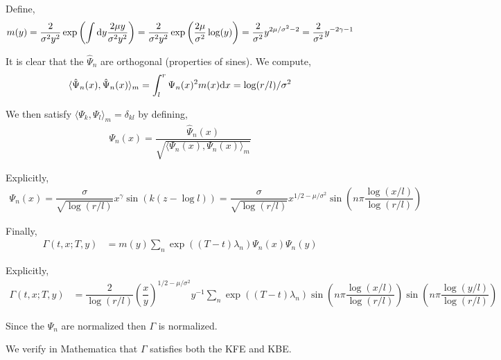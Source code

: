 \documentclass[10pt]{article}
\begin{document}
\begin{solution}[Solution]
Define,
\begin{align*}
    m(y) = \dfrac{2}{\sigma^2 y^2} \exp \left( \int\mathrm{d} y \dfrac{2 \mu y}{\sigma^2y^2}\right) 
    = \dfrac{2}{\sigma^2y^2}\exp \left( \dfrac{2\mu}{\sigma^2} \log(y) \right) 
    = \dfrac{2}{\sigma^2} y^{2\mu/\sigma^2-2}
    = \dfrac{2}{\sigma^2} y^{-2\gamma-1}
\end{align*}

It is clear that the \( \hat{\Psi}_n \) are orthogonal (properties of sines). We compute,
\begin{align*}
    \langle \hat{\Psi}_n(x), \hat{\Psi}_n(x) \rangle_m 
    = \int_{l}^{r}\Psi_n(x)^2 m(x) \mathrm{d} x 
    = \log(r/l) / \sigma^2
\end{align*}

We then satisfy \( \langle \Psi_k ,\Psi_l \rangle_m = \delta_{kl} \) by defining,
\begin{align*}
    \Psi_n(x) = \dfrac{ \hat{\Psi}_n(x) }{\sqrt{\langle \Psi_n(x), \Psi_n(x) \rangle_m}}
\end{align*}

Explicitly,
\begin{align*}
    \Psi_n(x) = \dfrac{\sigma}{\sqrt{\log(r/l)}}x^{\gamma}\sin(k(z-\log l)) 
    = \dfrac{\sigma}{\sqrt{\log(r/l)}}x^{1/2 - \mu/\sigma^2} \sin \left( n\pi \dfrac{\log(x/l)}{\log(r/l)} \right)
\end{align*}


Finally,
\begin{align*}
    \Gamma(t,x;T,y) &= m(y) \sum_{n} \exp((T-t) \lambda_n) \Psi_n(x)\Psi_n(y) 
\end{align*}

Explicitly,
\begin{align*}
    \Gamma(t,x;T,y) &= \dfrac{2}{\log(r/l)} \left( \dfrac{x}{y} \right)^{1/2-\mu/\sigma^2}y^{-1} \sum_{n} \exp((T-t) \lambda_n) \sin \left( n\pi \dfrac{\log(x/l)}{\log(r/l)} \right) \sin \left( n\pi \dfrac{\log(y/l)}{\log(r/l)} \right)
\end{align*}

Since the \( \Psi_n \) are normalized then \( \Gamma \) is normalized.

We verify in Mathematica that \( \Gamma \) satisfies both the KFE and KBE.
\end{solution}
\end{document}
